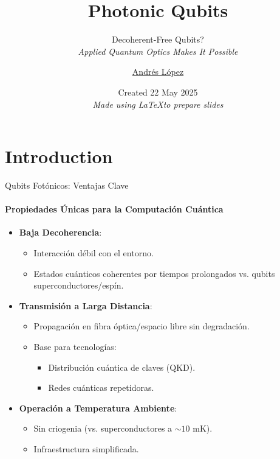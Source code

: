 \documentclass{beamer}
\title{Photonic Qubits}
\subtitle{Decoherent-Free Qubits?\\ \textit{Applied Quantum Optics Makes It Possible}\\}
\author{\href{mailto:anderiotti@ciencias.unam.mx}{Andrés López}}
\date{Created 22 May 2025 \\ \textit{Made using \LaTeX to prepare slides}}
\begin{document}
\maketitle
\section{Introduction}
\begin{frame}{Qubits Fotónicos: Ventajas Clave}
\framesubtitle{Propiedades Únicas para la Computación Cuántica}

\begin{itemize}
    \item \textbf{Baja Decoherencia}:
    \begin{itemize}
        \item Interacción débil con el entorno.
        \item Estados cuánticos coherentes por tiempos prolongados vs. qubits superconductores/espín.
    \end{itemize}
    
    \item \textbf{Transmisión a Larga Distancia}:
    \begin{itemize}
        \item Propagación en fibra óptica/espacio libre sin degradación.
        \item Base para tecnologías: 
        \begin{itemize}
            \item Distribución cuántica de claves (QKD).
            \item Redes cuánticas repetidoras.
        \end{itemize}
    \end{itemize}
    
    \item \textbf{Operación a Temperatura Ambiente}:
    \begin{itemize}
        \item Sin criogenia (vs. superconductores a $\sim 10$ mK).
        \item Infraestructura simplificada.
    \end{itemize}
\end{itemize}
\end{frame}
\end{document}
